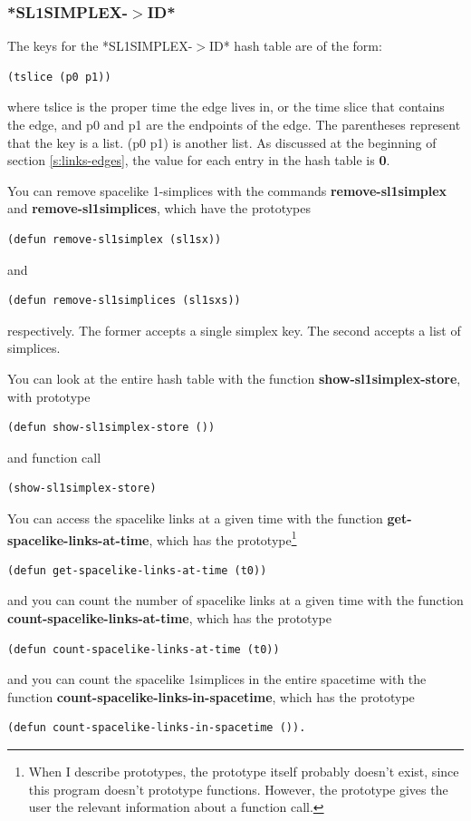 \message{ !name(programmers_guide.tex)}\documentclass[12pt]{article}
\begin{document}
\subsubsection{*SL1SIMPLEX-$>$ID*}
\label{sss:sl1simplex:id}
The keys for the *SL1SIMPLEX-$>$ID* hash table are of the form:
\begin{lstlisting}
(tslice (p0 p1))
\end{lstlisting}
where tslice is the proper time the edge lives in, or the time slice
that contains the edge, and p0 and p1 are the endpoints of the
edge. The parentheses represent that the key is a list. (p0 p1) is
another list. As discussed at the beginning of section
\ref{s:links-edges}, the value for each entry in the hash table is
\textbf{0}.

You can remove spacelike 1-simplices with the commands
\textbf{remove-sl1simplex} and \textbf{remove-sl1simplices}, which
have the prototypes
\begin{lstlisting}
(defun remove-sl1simplex (sl1sx))
\end{lstlisting}
and 
\begin{lstlisting}
(defun remove-sl1simplices (sl1sxs))
\end{lstlisting}
respectively. The former accepts a single simplex key. The second
accepts a list of simplices.

You can look at the entire hash table with the function
\textbf{show-sl1simplex-store}, with prototype
\begin{lstlisting}
(defun show-sl1simplex-store ())
\end{lstlisting}
and function call
\begin{lstlisting}
(show-sl1simplex-store)
\end{lstlisting}

You can access the spacelike links at a given time with the function
\textbf{get-spacelike-links-at-time}, which has the
prototype\footnote{When I describe prototypes, the prototype itself
  probably doesn't exist, since this program doesn't prototype
  functions. However, the prototype gives the user the relevant
  information about a function call.}
\begin{lstlisting}
(defun get-spacelike-links-at-time (t0))
\end{lstlisting}
and you can count the number of spacelike links at a given time with
the function \textbf{count-spacelike-links-at-time}, which has the
prototype
\begin{lstlisting}
(defun count-spacelike-links-at-time (t0))
\end{lstlisting}
and you can count the spacelike 1simplices in the entire spacetime
with the function \textbf{count-spacelike-links-in-spacetime}, which
has the prototype
\begin{lstlisting}
(defun count-spacelike-links-in-spacetime ()).
\end{lstlisting}
\end{document}
